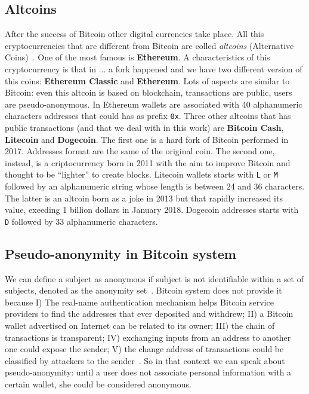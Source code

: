 \subsection{Altcoins}
After the success of Bitcoin other digital currencies take place. All this
cryptocurrencies that are different from Bitcoin are colled \textit{altcoins}
(Alternative Coins)~\cite{bitcoinbeyond}. One of the most famous is 
\textbf{Ethereum}. A characteristics of this cryptocurrency is that in ... a
fork happened and we have two different version of this coins: \textbf{Ethereum
Classic} and \textbf{Ethereum}. Lots of aspects are similar to Bitcoin: even
this altcoin is based on blockchain, transactions are public, users are
pseudo-anonymous. In Ethereum wallets are associated with 40 alphanumeric
characters addresses that could has as prefix \texttt{0x}. Three other altcoins
that has public transactions (and that we deal with in this work) are 
\textbf{Bitcoin Cash}, \textbf{Litecoin} and \textbf{Dogecoin}. The first one
is a hard fork of Bitcoin performed in 2017. Addresses format are the same of
the original coin. The second one, instead, is a criptocurrency born in 2011
with the aim to improve Bitcoin and thought to be ``lighter'' to create blocks.
Litecoin wallets starts with \texttt{L} or \texttt{M} followed by an
alphanumeric string whose length is between 24 and 36 characters. The latter
is an altcoin born as a joke in 2013 but that rapidly increased its value,
exeeding 1 billion dollars in January 2018. Dogecoin addresses starts with
\texttt{D} followed by 33 alphanumeric characters.

\subsection{Pseudo-anonymity in Bitcoin system}
We can define a subject as anonymous if subject is not identifiable within a
set of subjects, denoted as the anonymity set~\cite{terminology}. Bitcoin system
does not provide it because I) The real-name authentication mechanism
helps Bitcoin service providers to find the addresses that ever deposited and
withdrew; II) a Bitcoin wallet advertised on Internet can be related to its
owner; III) the chain of transactions is transparent; IV) exchanging inputs
from an address to another one could expose the sender; V) the change address
of transactions could be classified by attackers to the sender~\cite{deanon}.
So in that context we can speak about pseudo-anonymity: until a user does not
associate personal information with a certain wallet, she could be considered
anonymous.